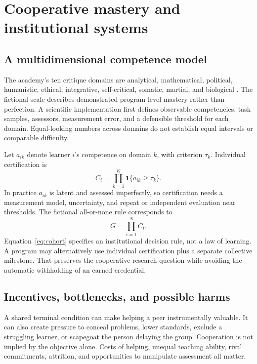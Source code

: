 \section{Cooperative mastery and institutional systems}
\subsection{A multidimensional competence model}
The academy's ten critique domains are analytical, mathematical, political, humanistic, ethical, integrative, self-critical, somatic, martial, and biological . The fictional scale describes demonstrated program-level mastery rather than perfection. A scientific implementation first defines observable competencies, task samples, assessors, measurement error, and a defensible threshold for each domain. Equal-looking numbers across domains do not establish equal intervals or comparable difficulty.

Let $a_{ik}$ denote learner $i$'s competence on domain $k$, with criterion $\tau_k$. Individual certification is
\begin{equation}
 C_i=\prod_{k=1}^{K}\mathbf 1\{a_{ik}\geq\tau_k\}.
\end{equation}
In practice $a_{ik}$ is latent and assessed imperfectly, so certification needs a measurement model, uncertainty, and repeat or independent evaluation near thresholds. The fictional all-or-none rule corresponds to
\begin{equation}
 G=\prod_{i=1}^{N}C_i.
 \label{eq:cohort}
\end{equation}
Equation~\eqref{eq:cohort} specifies an institutional decision rule, not a law of learning. A program may alternatively use individual certification plus a separate collective milestone. That preserves the cooperative research question while avoiding the automatic withholding of an earned credential.

\subsection{Incentives, bottlenecks, and possible harms}
A shared terminal condition can make helping a peer instrumentally valuable. It can also create pressure to conceal problems, lower standards, exclude a struggling learner, or scapegoat the person delaying the group. Cooperation is not implied by the objective alone. Costs of helping, unequal teaching ability, rival commitments, attrition, and opportunities to manipulate assessment all matter.

